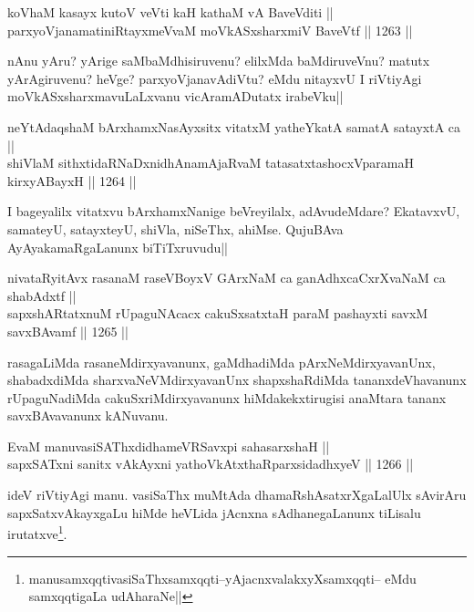 \begin{shl}
koV\s haM kasayx kutoV veVti kaH kathaM vA BaveVditi ||  \\
parxyoVjanamatiniRtayxmeVvaM moVkASxsharxmiV BaveVtf ||  1263 ||  
\end{shl}

\begin{artha}
nAnu yAru? yArige saMbaMdhisiruvenu? elilxMda baMdiruveVnu? matutx yArAgiruvenu? heVge? parxyoVjanavAdiVtu? eMdu nitayxvU I riVtiyAgi moVkASxsharxmavuLaLxvanu vicAramADutatx irabeVku||
\end{artha}


\begin{shl}
neYtAdaqshaM bArxhamxNasAyxsitx vitatxM yatheYkatA samatA satayxtA ca || \\
shiVlaM sithxtidaRNaDxnidhAnamAjaRvaM tatasatxtashocxVparamaH kirxyABayxH ||  1264 ||  
\end{shl}

\begin{artha}
I bageyalilx vitatxvu bArxhamxNanige beVreyilalx, adAvudeMdare? EkatavxvU, samateyU, satayxteyU, shiVla, niSeThx, ahiMse. QujuBAva AyAyakamaRgaLanunx biTiTxruvudu||
\end{artha}

\begin{shl}
nivataRyitAvx rasanaM raseVBoyxV GArxNaM ca ganAdhxcaCxrXvaNaM ca shabAdxtf || \\
sapxshARtatxnuM rUpaguNAcacx cakuSxsatxtaH paraM pashayxti savxM savxBAvamf ||  1265 ||  
\end{shl}

\begin{artha}
rasagaLiMda rasaneMdirxyavanunx, gaMdhadiMda pArxNeMdirxyavanUnx, shabadxdiMda sharxvaNeVMdirxyavanUnx shapxshaRdiMda tananxdeVhavanunx rUpaguNadiMda cakuSxriMdirxyavanunx hiMdakekxtirugisi anaMtara tananx savxBAvavanunx kANuvanu.
\end{artha}

\begin{shl}
EvaM manuvasiSAThxdidhameVRSavxpi sahasarxshaH || \\
sapxSATxni sanitx vAkAyxni yathoVkAtxthaRparxsidadhxyeV ||  1266 || 
\end{shl}

\begin{artha}
ideV riVtiyAgi manu. vasiSaThx muMtAda dhamaRshAsatxrXgaLalUlx sAvirAru sapxSatxvAkayxgaLu hiMde heVLida jAcnxna sAdhanegaLanunx tiLisalu irutatxve\footnote{manusamxqqti\stext \stext \stext \stext vasiSaThxsamxqqti--\stext \stext \stext \stext yAjacnxvalakxyXsamxqqti-- \stext \stext \stext \stext eMdu samxqqtigaLa udAharaNe||}.
\end{artha}


